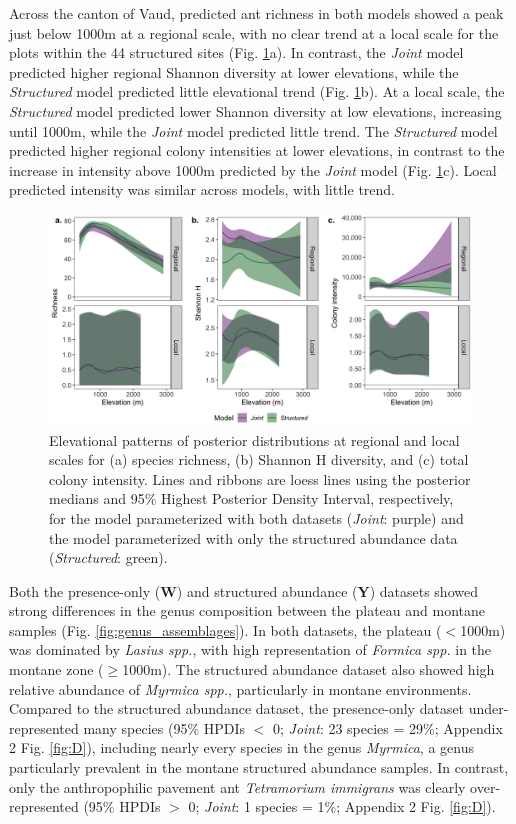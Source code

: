 \documentclass[preprint,review,times,12pt,3p]{elsarticle}
\begin{document}
Across the canton of Vaud, predicted ant richness in both models showed a peak just below 1000m at a regional scale, with no clear trend at a local scale for the plots within the 44 structured sites (Fig. \ref{fig:el_patterns}a). In contrast, the \emph{Joint} model predicted higher regional Shannon diversity at lower elevations, while the \emph{Structured} model predicted little elevational trend (Fig. \ref{fig:el_patterns}b). At a local scale, the \emph{Structured} model predicted lower Shannon diversity at low elevations, increasing until 1000m, while the \emph{Joint} model predicted little trend. The \emph{Structured} model predicted higher regional colony intensities at lower elevations, in contrast to the increase in intensity above 1000m predicted by the \emph{Joint} model (Fig. \ref{fig:el_patterns}c). Local predicted intensity was similar across models, with little trend. 

\begin{figure}
	\centering\includegraphics[width=6in]{ms/1_Ecography/1/figs/el_patterns.png}
	\caption{\label{fig:el_patterns} Elevational patterns of posterior distributions at regional and local scales for (a) species richness, (b) Shannon H diversity, and (c) total colony intensity. Lines and ribbons are loess lines using the posterior medians and 95\% Highest Posterior Density Interval, respectively, for the model parameterized with both datasets (\emph{Joint}: purple) and the model parameterized with only the structured abundance data (\emph{Structured}: green). }
\end{figure}

Both the presence-only (\textbf{W}) and structured abundance (\textbf{Y}) datasets showed strong differences in the genus composition between the plateau and montane samples (Fig. \ref{fig:genus_assemblages}). In both datasets, the plateau ($<$1000m) was dominated by \emph{Lasius spp.}, with high representation of \emph{Formica spp.} in the montane zone ($\geq$1000m). The structured abundance dataset also showed high relative abundance of \emph{Myrmica spp.}, particularly in montane environments. Compared to the structured abundance dataset, the presence-only dataset under-represented many species (95\% HPDIs $<$ 0; \emph{Joint}: 23 species = 29\%; Appendix 2 Fig. \ref{fig:D}), including nearly every species in the genus \emph{Myrmica}, a genus particularly prevalent in the montane structured abundance samples. In contrast, only the anthropophilic pavement ant \emph{Tetramorium immigrans} was clearly over-represented (95\% HPDIs $>$ 0; \emph{Joint}: 1 species = 1\%; Appendix 2 Fig. \ref{fig:D}). 
\end{document}
